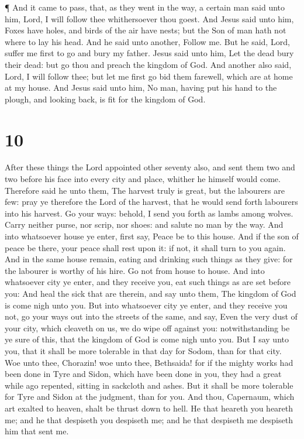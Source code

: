  ¶ And it came to pass, that, as they went in the way, a
certain man said unto him, Lord, I will follow thee whithersoever thou
goest.  And Jesus said unto him, Foxes have holes, and
birds of the air have nests; but the Son of man hath not where to lay
his head.  And he said unto another, Follow me. But he
said, Lord, suffer me first to go and bury my father. 
Jesus said unto him, Let the dead bury their dead: but go thou and
preach the kingdom of God.  And another also said, Lord, I
will follow thee; but let me first go bid them farewell, which are at
home at my house.  And Jesus said unto him, No man, having
put his hand to the plough, and looking back, is fit for the kingdom of
God.

\hypertarget{section-9}{%
\section{10}\label{section-9}}

 After these things the Lord appointed other seventy also,
and sent them two and two before his face into every city and place,
whither he himself would come.  Therefore said he unto them,
The harvest truly is great, but the labourers are few: pray ye therefore
the Lord of the harvest, that he would send forth labourers into his
harvest.  Go your ways: behold, I send you forth as lambs
among wolves.  Carry neither purse, nor scrip, nor shoes:
and salute no man by the way.  And into whatsoever house ye
enter, first say, Peace be to this house.  And if the son of
peace be there, your peace shall rest upon it: if not, it shall turn to
you again.  And in the same house remain, eating and
drinking such things as they give: for the labourer is worthy of his
hire. Go not from house to house.  And into whatsoever city
ye enter, and they receive you, eat such things as are set before you:
 And heal the sick that are therein, and say unto them, The
kingdom of God is come nigh unto you.  But into whatsoever
city ye enter, and they receive you not, go your ways out into the
streets of the same, and say,  Even the very dust of your
city, which cleaveth on us, we do wipe off against you: notwithstanding
be ye sure of this, that the kingdom of God is come nigh unto you.
 But I say unto you, that it shall be more tolerable in
that day for Sodom, than for that city.  Woe unto thee,
Chorazin! woe unto thee, Bethsaida! for if the mighty works had been
done in Tyre and Sidon, which have been done in you, they had a great
while ago repented, sitting in sackcloth and ashes.  But it
shall be more tolerable for Tyre and Sidon at the judgment, than for
you.  And thou, Capernaum, which art exalted to heaven,
shalt be thrust down to hell.  He that heareth you heareth
me; and he that despiseth you despiseth me; and he that despiseth me
despiseth him that sent me.

